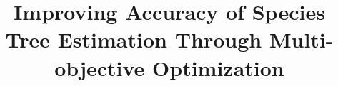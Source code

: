 \documentclass[runningheads]{llncs}
\begin{document}
%
\title{Improving Accuracy of Species Tree Estimation Through Multi-objective Optimization}
\author{}
\institute{}
%
\maketitle              %
%

 
 






%
%
%


\end{document}
